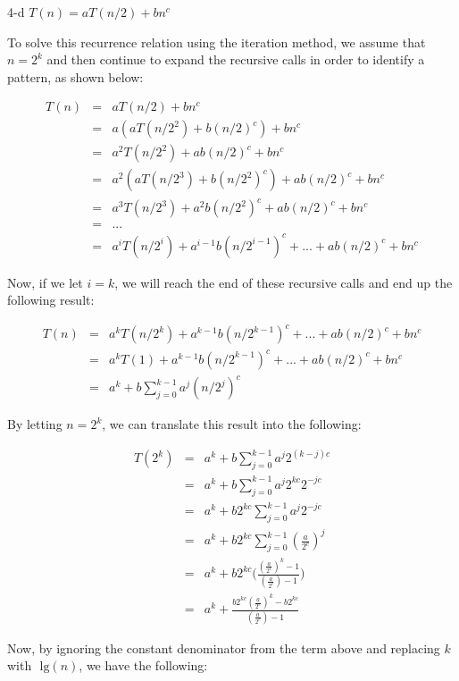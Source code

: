 \documentclass[11pt]{article}
\newcommand{\tlg}{\text{ lg}}
\begin{document}
\begin{prob}{4-d}
$T(n) = aT(n/2) + bn^{c}$
\end{prob}
\begin{sol} 

To solve this recurrence relation using the iteration method, we assume that $n = 2^k$ and then continue to expand the recursive calls in order to identify a pattern, as shown below:

\begin{eqnarray*}
T(n) & = & aT(n/2) + bn^c \\
& = & a(aT(n/2^2) + b(n/2)^c) + bn^c \\
& = & a^2T(n/2^2) + ab(n/2)^c + bn^c\\
& = & a^2(aT(n/2^3) + b(n/2^2)^c) + ab(n/2)^c + bn^c \\
& = & a^3T(n/2^3) + a^2b(n/2^2)^c + ab(n/2)^c + bn^c \\
& = & ... \\
& = & a^iT(n/2^i) + a^{i-1}b(n/2^{i-1})^c + ... + ab(n/2)^c + bn^c
\end{eqnarray*}

Now, if we let $i = k$, we will reach the end of these recursive calls and end up the following result:

\begin{eqnarray*}
T(n) & = & a^{k}T(n/2^k) + a^{k-1}b(n/2^{k-1})^c + ... + ab(n/2)^c + bn^c \\
& = & a^{k}T(1) + a^{k-1}b(n/2^{k-1})^c + ... + ab(n/2)^c + bn^c \\
& = & a^{k} + b\sum_{j=0}^{k-1} a^j(n/2^j)^c
\end{eqnarray*}

By letting $n=2^k$, we can translate this result into the following:

\begin{eqnarray*}
T(2^k) & = & a^{k} + b\sum_{j=0}^{k-1} a^j2^{(k-j)c} \\
& = & a^{k} + b\sum_{j=0}^{k-1} a^j2^{kc}2^{-jc} \\
& = & a^{k} + b2^{kc}\sum_{j=0}^{k-1} a^j2^{-jc} \\
& = & a^{k} + b2^{kc}\sum_{j=0}^{k-1} (\frac{a}{2^c})^j \\
& = & a^{k} + b2^{kc}\Bigg(\frac{(\frac{a}{2^c})^k - 1}{(\frac{a}{2^c}) - 1} \Bigg) \\
& = & a^{k} + \frac{b2^{kc}(\frac{a}{2^c})^k - b2^{kc}}{(\frac{a}{2^c}) - 1} 
\end{eqnarray*}

Now, by ignoring the constant denominator from the term above and replacing $k$ with $\tlg(n)$, we have the following:


\end{sol}
\end{document}
